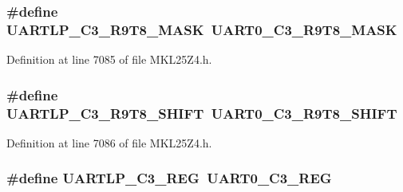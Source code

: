\subsubsection[{\texorpdfstring{U\+A\+R\+T\+L\+P\+\_\+\+C3\+\_\+\+R9\+T8\+\_\+\+M\+A\+SK}{UARTLP_C3_R9T8_MASK}}]{\setlength{\rightskip}{0pt plus 5cm}\#define U\+A\+R\+T\+L\+P\+\_\+\+C3\+\_\+\+R9\+T8\+\_\+\+M\+A\+SK~{\bf U\+A\+R\+T0\+\_\+\+C3\+\_\+\+R9\+T8\+\_\+\+M\+A\+SK}}\hypertarget{group___backward___compatibility___symbols_gaad5e79813f247fac083e627e4125a1b0}{}\label{group___backward___compatibility___symbols_gaad5e79813f247fac083e627e4125a1b0}


Definition at line 7085 of file M\+K\+L25\+Z4.\+h.

\subsubsection[{\texorpdfstring{U\+A\+R\+T\+L\+P\+\_\+\+C3\+\_\+\+R9\+T8\+\_\+\+S\+H\+I\+FT}{UARTLP_C3_R9T8_SHIFT}}]{\setlength{\rightskip}{0pt plus 5cm}\#define U\+A\+R\+T\+L\+P\+\_\+\+C3\+\_\+\+R9\+T8\+\_\+\+S\+H\+I\+FT~{\bf U\+A\+R\+T0\+\_\+\+C3\+\_\+\+R9\+T8\+\_\+\+S\+H\+I\+FT}}\hypertarget{group___backward___compatibility___symbols_gaaffea46f675353dc12aa3b19a9da33b0}{}\label{group___backward___compatibility___symbols_gaaffea46f675353dc12aa3b19a9da33b0}


Definition at line 7086 of file M\+K\+L25\+Z4.\+h.

\subsubsection[{\texorpdfstring{U\+A\+R\+T\+L\+P\+\_\+\+C3\+\_\+\+R\+EG}{UARTLP_C3_REG}}]{\setlength{\rightskip}{0pt plus 5cm}\#define U\+A\+R\+T\+L\+P\+\_\+\+C3\+\_\+\+R\+EG~{\bf U\+A\+R\+T0\+\_\+\+C3\+\_\+\+R\+EG}}\hypertarget{group___backward___compatibility___symbols_ga7b454d7b3d155a39f86199b5a9eb164a}{}\label{group___backward___compatibility___symbols_ga7b454d7b3d155a39f86199b5a9eb164a}


